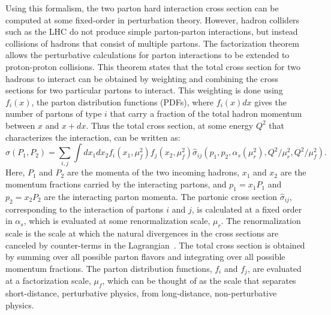 Using this formalism, the two parton hard interaction cross section can be computed at some fixed-order in perturbation theory. 
However, hadron colliders such as the LHC do not produce simple parton-parton interactions, but instead collisions of hadrons that consist of multiple partons. 
The factorization theorem~\cite{Collins:1989gx} allows the perturbative calculations for parton interactions to be extended to proton-proton collisions. This theorem states that the total cross section for two hadrons to interact can be obtained by weighting and combining the cross sections for two particular partons to interact. This weighting is done using $f_i(x)$, the parton distribution functions (PDFs), where $f_i(x)dx$ gives the number of partons of type $i$ that carry a fraction of the total hadron momentum between $x$ and $x+dx$. Thus the total cross section, at some energy $Q^2$ that characterizes the interaction, can be written as:
%
\begin{equation}
\sigma(P_1,P_2) = \sum_{i,j} \int dx_1 dx_2 f_i(x_1,\mu^2_f) f_j(x_2,\mu^2_f) \hat{\sigma}_{ij}(p_1,p_2,\alpha_s(\mu^2_r),Q^2/\mu^2_r,Q^2/\mu^2_f).
 \label{eq:sigmaP1P2}
\end{equation}
%
Here, $P_1$ and $P_2$ are the momenta of the two incoming hadrons, $x_1$ and $x_2$ are the momentum fractions carried by the interacting partons, and $p_1 = x_1P_1$ and $p_2 = x_2P_2$ are the interacting parton momenta. 
The partonic cross section $\hat{\sigma}_{ij}$, corresponding to the interaction of partons $i$ and $j$, is calculated at a fixed order in $\alpha_s$, which is evaluated at some renormalization scale, $\mu_r$.  The renormalization scale is the scale at which the natural divergences in the cross sections are canceled by counter-terms in the Lagrangian~\cite{tHooft1973455,PhysRevD.8.3497}.  
The total cross section is obtained by summing over all possible parton flavors and integrating over all possible momentum fractions. 
The parton distribution functions, $f_i$ and $f_j$, are evaluated at a factorization scale, $\mu_f$, which can be thought of as the scale that separates short-distance, perturbative physics, from long-distance, non-perturbative physics.  %

